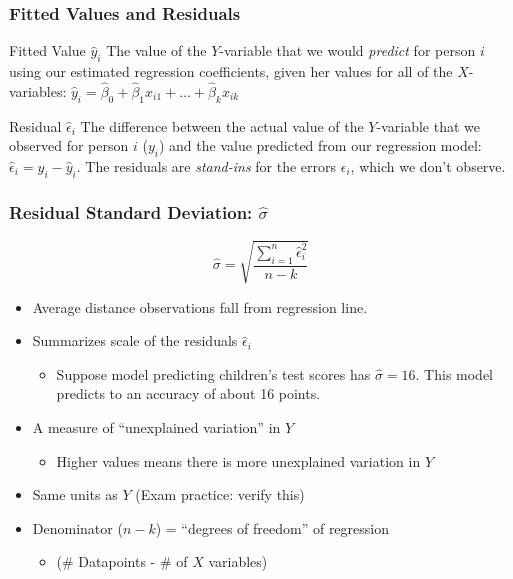 \documentclass{beamer}
\begin{document}
\begin{frame}
\frametitle{Fitted Values and Residuals}

\begin{block}{Fitted Value $\widehat{y}_i$}
The value of the $Y$-variable that we would \emph{predict} for person $i$ using our estimated regression coefficients, given her values for all of the $X$-variables: \alert{$\widehat{y}_i = \widehat{\beta}_0 + \widehat{\beta}_1 x_{i1} + \hdots + \widehat{\beta}_k x_{ik}$}
\end{block}


\begin{block}{Residual $\widehat{\epsilon}_i$}
The difference between the actual value of the $Y$-variable that we observed for person $i$ ($y_i$) and the value predicted from our regression model: \alert{$\widehat{\epsilon}_i = y_i - \widehat{y}_i$}. The residuals are \emph{stand-ins} for the errors $\epsilon_i$, which we don't observe.
\end{block}

\end{frame}
\begin{frame}
\frametitle{Residual Standard Deviation: $\widehat{\sigma}$}
	$$\widehat{\sigma}  = \sqrt{\frac{\sum_{i=1}^n \widehat{\epsilon}_i^2}{n -k}}$$ 
	\begin{itemize}
		\item 	Average distance observations fall from regression line.
		\item Summarizes scale of the residuals $\widehat{\epsilon}_i$ 
				\begin{itemize}
					\item Suppose model predicting children's test scores has $\widehat{\sigma}=16$. This model predicts to an accuracy of about 16 points. 
				\end{itemize}
	\item A  measure of ``unexplained variation'' in $Y$
		\begin{itemize}
			\item Higher values means there is more unexplained variation in $Y$ 
		\end{itemize}
	\item Same units as $Y$ (Exam practice: verify this) 
	\item Denominator  ($n-k$) = ``degrees of freedom'' of regression
		\begin{itemize}
			\item (\# Datapoints - \# of $X$ variables) 
		\end{itemize}
	\end{itemize}

\end{frame}
\end{document}
